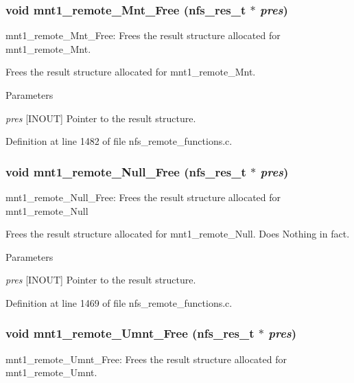 \subsubsection[{mnt1\_\-remote\_\-Mnt\_\-Free}]{\setlength{\rightskip}{0pt plus 5cm}void mnt1\_\-remote\_\-Mnt\_\-Free (nfs\_\-res\_\-t $\ast$ {\em pres})}\label{group__NFSprocs_ga30f7512619321620f25509a49b9cb1df}
mnt1\_\-remote\_\-Mnt\_\-Free: Frees the result structure allocated for mnt1\_\-remote\_\-Mnt.

Frees the result structure allocated for mnt1\_\-remote\_\-Mnt.


\begin{DoxyParams}{Parameters}
\item[{\em pres}][INOUT] Pointer to the result structure. \end{DoxyParams}


Definition at line 1482 of file nfs\_\-remote\_\-functions.c.
\subsubsection[{mnt1\_\-remote\_\-Null\_\-Free}]{\setlength{\rightskip}{0pt plus 5cm}void mnt1\_\-remote\_\-Null\_\-Free (nfs\_\-res\_\-t $\ast$ {\em pres})}\label{group__NFSprocs_ga32153d3174089abc0a77053fe63a66bb}
mnt1\_\-remote\_\-Null\_\-Free: Frees the result structure allocated for mnt1\_\-remote\_\-Null

Frees the result structure allocated for mnt1\_\-remote\_\-Null. Does Nothing in fact.


\begin{DoxyParams}{Parameters}
\item[{\em pres}][INOUT] Pointer to the result structure. \end{DoxyParams}


Definition at line 1469 of file nfs\_\-remote\_\-functions.c.
\subsubsection[{mnt1\_\-remote\_\-Umnt\_\-Free}]{\setlength{\rightskip}{0pt plus 5cm}void mnt1\_\-remote\_\-Umnt\_\-Free (nfs\_\-res\_\-t $\ast$ {\em pres})}\label{group__NFSprocs_gadab285d3b5c4787476d82985d5d1a41e}
mnt1\_\-remote\_\-Umnt\_\-Free: Frees the result structure allocated for mnt1\_\-remote\_\-Umnt.


